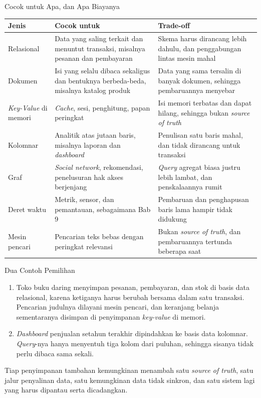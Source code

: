 \documentclass[aspectratio=169, table, 12pt]{beamer}
\begin{document}
\begin{frame}{{\Large Cocok untuk Apa, dan Apa Biayanya}}
  \vspace{3pt}
  \centering
  {\scriptsize
  \begin{tabularx}{\textwidth}{lYY}
    \hline
    \textbf{Jenis} & \textbf{Cocok untuk} & \textbf{Trade-off} \\
    \hline
    Relasional & Data yang saling terkait dan menuntut transaksi, misalnya pesanan dan pembayaran & Skema harus dirancang lebih dahulu, dan penggabungan lintas mesin mahal \\
    \hline
    Dokumen & Isi yang selalu dibaca sekaligus dan bentuknya berbeda-beda, misalnya katalog produk & Data yang sama tersalin di banyak dokumen, sehingga pembaruannya menyebar \\
    \hline
    \textit{Key-Value} di memori & \textit{Cache}, sesi, penghitung, papan peringkat & Isi memori terbatas dan dapat hilang, sehingga bukan \textit{source of truth} \\
    \hline
    Kolomnar & Analitik atas jutaan baris, misalnya laporan dan \textit{dashboard} & Penulisan satu baris mahal, dan tidak dirancang untuk transaksi \\
    \hline
    Graf & \textit{Social network}, rekomendasi, penelusuran hak akses berjenjang & \textit{Query} agregat biasa justru lebih lambat, dan penskalaannya rumit \\
    \hline
    Deret waktu & Metrik, sensor, dan pemantauan, sebagaimana Bab 9 & Pembaruan dan penghapusan baris lama hampir tidak didukung \\
    \hline
    Mesin pencari & Pencarian teks bebas dengan peringkat relevansi & Bukan \textit{source of truth}, dan pembaruannya tertunda beberapa saat \\
    \hline
  \end{tabularx}}
\end{frame}

\begin{frame}{{\Large Dua Contoh Pemilihan}}
  \vspace{8pt}
  \begin{enumerate}
    \item Toko buku daring menyimpan pesanan, pembayaran, dan stok di basis
          data relasional, karena ketiganya harus berubah bersama dalam satu
          transaksi. Pencarian judulnya dilayani mesin pencari, dan keranjang
          belanja sementaranya disimpan di penyimpanan \textit{key-value} di memori.
    \item \textit{Dashboard} penjualan setahun terakhir dipindahkan ke basis
          data kolomnar. \textit{Query}-nya hanya menyentuh tiga kolom dari puluhan,
          sehingga sisanya tidak perlu dibaca sama sekali.
  \end{enumerate}
  \vspace{6pt}
  {\footnotesize Tiap penyimpanan tambahan kemungkinan menambah satu \textit{source of truth},
  satu jalur penyalinan data, satu kemungkinan data tidak sinkron, dan satu
  sistem lagi yang harus dipantau serta dicadangkan.}
\end{frame}
\end{document}
